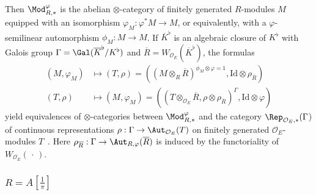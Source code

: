 Then $\Mod_{R,\ast}^{\varphi}$ is the abelian $\otimes$-category of finitely generated $R$-modules $M$ equipped with an isomorphism $\varphi_{M}:\varphi^{\ast}M\rightarrow M$, or equivalently, with a $\varphi$-semilinear automorphism $\phi_{M}:M\rightarrow M$. If $\overline{K}^{\flat}$ is an algebraic closure of $K^{\flat}$ with Galois group $\Gamma=\Gal(\overline{K}^{\flat}/K^{\flat})$ and $\overline{R}=W_{\mathcal{O}_{E}}(\overline{K}^{\flat})$, the formulas
\begin{align*}
(M,\varphi_{M}) & \mapsto (T,\rho)=\left(\left(M\otimes_{R}\overline{R}\right)^{\phi_{M}\otimes\varphi=1},\mathrm{Id}\otimes\rho_{\overline{R}}\right)\\
(T,\rho) & \mapsto (M,\varphi_{M})=\left(\left(T\otimes_{\mathcal{O}_{E}}\overline{R},\rho\otimes\rho_{\overline{R}}\right)^{\Gamma},\mathrm{Id}\otimes\varphi\right)
\end{align*}
yield equivalences of $\otimes$-categories between $\Mod_{R,\ast}^{\varphi}$ and the category $\Rep_{\mathcal{O}_{E},\ast}(\Gamma$) of continuous representations $\rho:\Gamma\rightarrow\Aut_{\mathcal{O}_{E}}(T)$ on finitely generated $\mathcal{O}_{E}$-modules $T$~\cite[1.2.6]{Fo90}. Here $\rho_{\overline{R}}:\Gamma\rightarrow\Aut_{R,\varphi}(\overline{R})$ is induced by the functoriality of $W_{\mathcal{O}_{E}}({\,\cdot\,})$.

\subsubsection{\texorpdfstring{${{R=A[\frac{1}{\pi}]}}$}{R=A[1/pi]}}\label{subsec:RisA=00005B1/pi=00005D}

